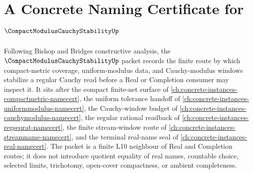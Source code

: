 \chapter{A Concrete Naming Certificate for $\CompactModulusCauchyStabilityUp$}
\label{ch:concrete-instances-compact-modulus-cauchy-stability-namecert}

Following Bishop and Bridges constructive analysis, the $\CompactModulusCauchyStabilityUp$ packet records the finite route by which compact-metric coverage, uniform-modulus data, and Cauchy-modulus windows stabilize a regular Cauchy read before a Real or Completion consumer may inspect it. It sits after the compact finite-net surface of \autoref{ch:concrete-instances-compactmetric-namecert}, the uniform tolerance handoff of \autoref{ch:concrete-instances-uniformmodulus-namecert}, the Cauchy-window budget of \autoref{ch:concrete-instances-cauchymodulus-namecert}, the regular rational readback of \autoref{ch:concrete-instances-regseqrat-namecert}, the finite stream-window route of \autoref{ch:concrete-instances-streamname-namecert}, and the terminal real-name seal of \autoref{ch:concrete-instances-real-namecert}. The packet is a finite L10 neighbour of Real and Completion routes; it does not introduce quotient equality of real names, countable choice, selected limits, trichotomy, open-cover compactness, or ambient completeness.


